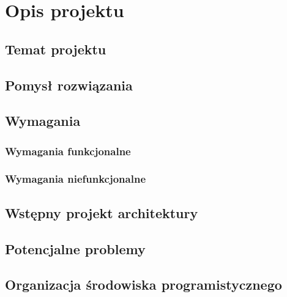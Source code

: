 \chapter{Opis projektu}

\section{Temat projektu}

\section{Pomysł rozwiązania}

\section{Wymagania}

\subsection{Wymagania funkcjonalne}

\subsection{Wymagania niefunkcjonalne}

\section{Wstępny projekt architektury}

\section{Potencjalne problemy}

\section{Organizacja środowiska programistycznego}